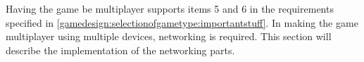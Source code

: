 Having the game be multiplayer supports items 5 and 6 in the requirements specified in \ref{gamedesign:selectionofgametype:importantstuff}.
In making the game multiplayer using multiple devices, networking is required.
This section will describe the implementation of the networking parts.



